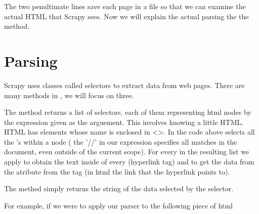 The two penultimate lines save each page in a file so that we can examine the actual HTML that Scrapy sees.
Now we will explain the actual parsing the the  method.

\section*{Parsing}
Scrapy uses classes called selectors to extract data from web pages.
There are many methods in , we will focus on three.

The  method returns a list of selectors, each of them representing html nodes by the expression given as the arguement. 
This involves knowing a little HTML. 
HTML has elements whose name is enclosed in <>. 
In the code above  selects  all the 's within a  node ( the '//' in our expression specifies all matches in the document, even outside of the current scope). 
For every  in the resulting list we apply  to obtain the text inside of every  (hyperlink tag) and  to get the data from the  atribute from the  tag (in html the link that the hyperlink points to). 

The  methed simply returns the string of the data selected by the selector.

For example, if we were to apply our parser to the following piece of html

